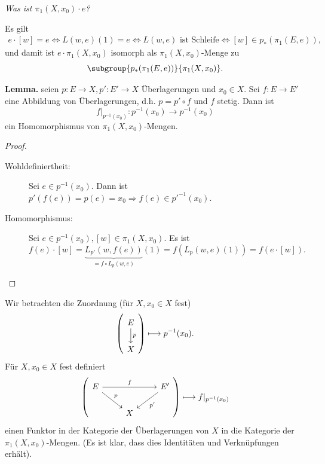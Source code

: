 \documentclass[language=ngerman]{TemplateLecture} %
\begin{document}
\emph{Was ist $\pi_1(X,x_0) \cdot e$?}

Es gilt 
\begin{align*}
    e \cdot [w] = e \Leftrightarrow L(w,e)(1) = e \Leftrightarrow L(w,e) \text{ ist Schleife} \Leftrightarrow [w] \in p_*(\pi_1(E,e)),
\end{align*}
und damit ist $e \cdot \pi_1(X,x_0)$ isomorph als $\pi_1(X,x_0)$-Menge zu 
\begin{equation*}
    \subgroup{p_*(\pi_1(E,e))}{\pi_1(X,x_0)}.
\end{equation*}

\textbf{Lemma.} seien $p: E \to X, p': E' \to X$ Überlagerungen und $x_0 \in X$. Sei $f: E \to E'$ eine Abbildung von Überlagerungen, d.h. $p = p' \circ f$ und $f$ stetig. Dann ist
\begin{equation*}
    f|_{p^{-1}(x_0)} : p^{-1}(x_0) \to p^{-1}(x_0)
\end{equation*}
ein Homomorphismus von $\pi_1(X,x_0)$-Mengen.
\begin{proof}
    \begin{description}
        \item[Wohldefiniertheit:] Sei $e \in p^{-1}(x_0)$. Dann ist $p'(f(e)) = p(e) = x_0 \Rightarrow f(e) \in p'^{-1}(x_0)$.
        \item[Homomorphismus:] Sei $e \in p^{-1}(x_0), [w] \in \pi_1(X,x_0)$. Es ist 
        \begin{equation*}
            f(e) \cdot [w] = \underset{=f \circ L_p(w,e)}{\underbrace{L_{p'}(w, f(e))}}(1) = f(L_p(w,e)(1)) = f(e \cdot [w]).
        \end{equation*}
    \end{description}
\end{proof}

Wir betrachten die Zuordnung (für $X, x_0 \in X$ fest)
\begin{equation*}
    \left(\begin{tikzcd}
        E \arrow[d, "p"] \\ X
    \end{tikzcd}\right) \longmapsto p^{-1}(x_0).
\end{equation*}
Für $X, x_0 \in X$ fest definiert 
\begin{equation}
    \left(\begin{tikzcd}
        E \arrow[rr, "f"] \arrow[dr, "p"] & & E' \arrow[dl, "p'"] \\ & X &
    \end{tikzcd}\right) \longmapsto f|_{p^{-1}(x_0)}\label{eq:functorStuff}
\end{equation}
einen Funktor in der Kategorie der Überlagerungen von $X$ in die Kategorie der $\pi_1(X,x_0)$-Mengen. (Es ist klar, dass dies Identitäten und Verknüpfungen erhält).
\end{document}
